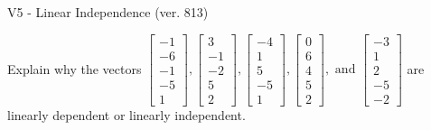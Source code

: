 \begin{exercise}
  \begin{exerciseTitle}V5 - Linear Independence (ver. 813)\end{exerciseTitle}
  \begin{exerciseStatement}
    Explain why the vectors \(\left[\begin{array}{r}
-1 \\
-6 \\
-1 \\
-5 \\
1
\end{array}\right] , \left[\begin{array}{r}
3 \\
-1 \\
-2 \\
5 \\
2
\end{array}\right] , \left[\begin{array}{r}
-4 \\
1 \\
5 \\
-5 \\
1
\end{array}\right] , \left[\begin{array}{r}
0 \\
6 \\
4 \\
5 \\
2
\end{array}\right] , \text{ and } \left[\begin{array}{r}
-3 \\
1 \\
2 \\
-5 \\
-2
\end{array}\right]\) are linearly dependent or linearly independent.	



\end{exerciseStatement}
\end{exercise}
